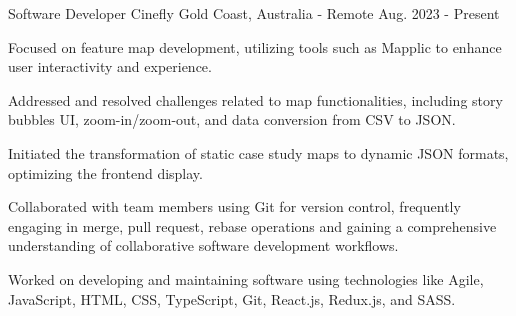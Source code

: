 

\begin{cventries}

  \cventry
    {Software Developer} %
    {Cinefly} %
    {Gold Coast, Australia - Remote} %
    {Aug. 2023 - Present} %
    {
  \begin{cvitems} %
    \item {Focused on feature map development, utilizing tools such as Mapplic to enhance user interactivity and experience.}
    \item {Addressed and resolved challenges related to map functionalities, including story bubbles UI, zoom-in/zoom-out, and data conversion from CSV to JSON.}
    \item {Initiated the transformation of static case study maps to dynamic JSON formats, optimizing the frontend display.}
    \item {Collaborated with team members using Git for version control, frequently engaging in merge, pull request, rebase operations and gaining a comprehensive understanding of collaborative software development workflows.}
    \item {Worked on developing and maintaining software using technologies like Agile, JavaScript, HTML, CSS, TypeScript, Git, React.js, Redux.js, and SASS.}
  \end{cvitems}
}


\end{cventries}
